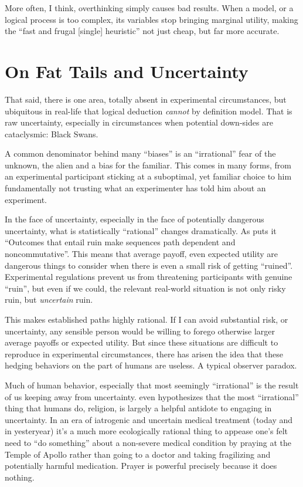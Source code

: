 \documentclass{article}
\begin{document}
More often, I think, overthinking simply causes bad results.
When a model, or a logical process is too complex, its variables stop bringing marginal utility, making the ``fast and frugal [single] heuristic'' not just cheap, but far more accurate.


\section{On Fat Tails and Uncertainty\label{tails}}

That said, there is one area, totally absent in experimental circumstances, but ubiquitous in real-life that logical deduction \emph{cannot} by definition model.
That is raw uncertainty, especially in circumstances when potential down-sides are cataclysmic: Black Swans.

A common denominator behind many ``biases'' is an ``irrational'' fear of the unknown, the alien and a bias for the familiar.
This comes in many forms, from an experimental participant sticking at a suboptimal, yet familiar choice to him fundamentally not trusting what an experimenter has told him about an experiment.

In the face of uncertainty, especially in the face of potentially dangerous uncertainty, what is statistically ``rational'' changes dramatically.
As \textcite{taleb18} puts it ``Outcomes that entail ruin make sequences path dependent and noncommutative''.
This means that average payoff, even expected utility are dangerous things to consider when there is even a small risk of getting ``ruined''.
Experimental regulations prevent us from threatening participants with genuine ``ruin'', but even if we could, the relevant real-world situation is not only risky ruin, but \emph{uncertain} ruin.

This makes established paths highly rational.
If I can avoid substantial risk, or uncertainty, any sensible person would be willing to forego otherwise larger average payoffs or expected utility.
But since these situations are difficult to reproduce in experimental circumstances, there has arisen the idea that these hedging behaviors on the part of humans are useless.
A typical observer paradox.

Much of human behavior, especially that most seemingly ``irrational'' is the result of us keeping away from uncertainty.
\textcite{taleb12} even hypothesizes that the most ``irrational'' thing that humans do, religion, is largely a helpful antidote to engaging in uncertainty.
In an era of iatrogenic and uncertain medical treatment (today and in yesteryear) it's a much more ecologically rational thing to appease one's felt need to ``do something'' about a non-severe medical condition by praying at the Temple of Apollo rather than going to a doctor and taking fragilizing and potentially harmful medication.
Prayer is powerful precisely because it does nothing.
\end{document}
